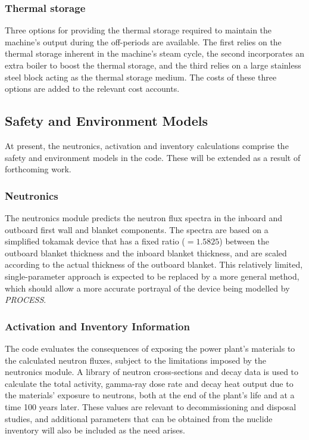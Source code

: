 \documentclass[11pt,a4paper]{report}
\makeatletter
\newcommand{\PSD}{\mbox{\it PROCESS}\@.\/ }
\makeatother
\begin{document}
\subsubsection{Thermal storage}
Three options for providing the thermal storage required to maintain the
machine's output during the off-periods are available. The first relies on the
thermal storage inherent in the machine's steam cycle, the second incorporates
an extra boiler to boost the thermal storage, and the third relies on a large
stainless steel block acting as the thermal storage medium. The costs of these
three options are added to the relevant cost accounts.

\subsection{Safety and Environment Models}
At present, the neutronics, activation and inventory calculations comprise the
safety and environment models in the code. These will be extended as a result
of forthcoming work.

\subsubsection{Neutronics}
The neutronics module predicts the neutron flux spectra in the inboard and
outboard first wall and blanket components. The spectra are based on a
simplified tokamak device that has a fixed ratio ($=1.5825$) between the
outboard blanket thickness and the inboard blanket thickness, and are scaled
according to the actual thickness of the outboard blanket. This relatively
limited, single-parameter approach is expected to be replaced by a more
general method, which should allow a more accurate portrayal of the device
being modelled by \PSD

\subsubsection{Activation and Inventory Information}
The code evaluates the consequences of exposing the power plant's materials to
the calculated neutron fluxes, subject to the limitations imposed by the
neutronics module. A library of neutron cross-sections and decay data is used
to calculate the total activity, gamma-ray dose rate and decay heat output due
to the materials' exposure to neutrons, both at the end of the plant's life
and at a time 100 years later. These values are relevant to decommissioning
and disposal studies, and additional parameters that can be obtained from the
nuclide inventory will also be included as the need arises.
\end{document}
